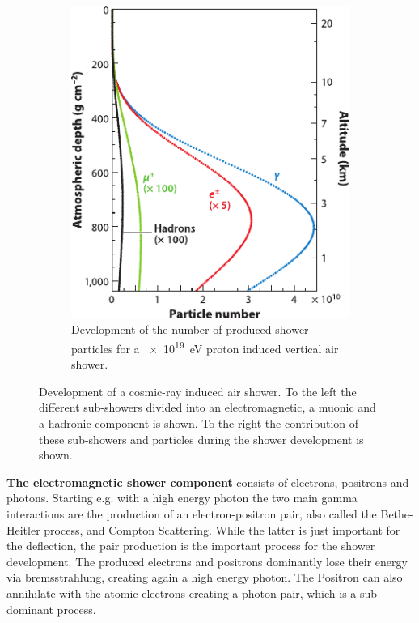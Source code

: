 \begin{figure}
\begin{subfigure}[t]{0.47\textwidth}
        \includegraphics[width=\textwidth]{./images/air_shower_development.pdf}
        \caption{Development of the number of produced shower particles for a \SI{e19}{eV} proton induced vertical air shower. \cite{Engel11EAS}}
        \label{fig:air_shower_development}
    \end{subfigure}
    \caption{Development of a cosmic-ray induced air shower. To the left the different sub-showers divided into an electromagnetic, a muonic and a hadronic component is shown. To the right the contribution of these sub-showers and particles during the shower development is shown.}
    \label{fig:air_shower}
\end{figure}

\textbf{The electromagnetic shower component} consists of electrons, positrons and photons.
Starting e.g. with a high energy photon the two main gamma interactions are the production of an electron-positron pair, also called the Bethe-Heitler process, and Compton Scattering.
While the latter is just important for the deflection, the pair production is the important process for the shower development.
The produced electrons and positrons dominantly lose their energy via bremsstrahlung, creating again a high energy photon.
The Positron can also annihilate with the atomic electrons creating a photon pair, which is a sub-dominant process.

